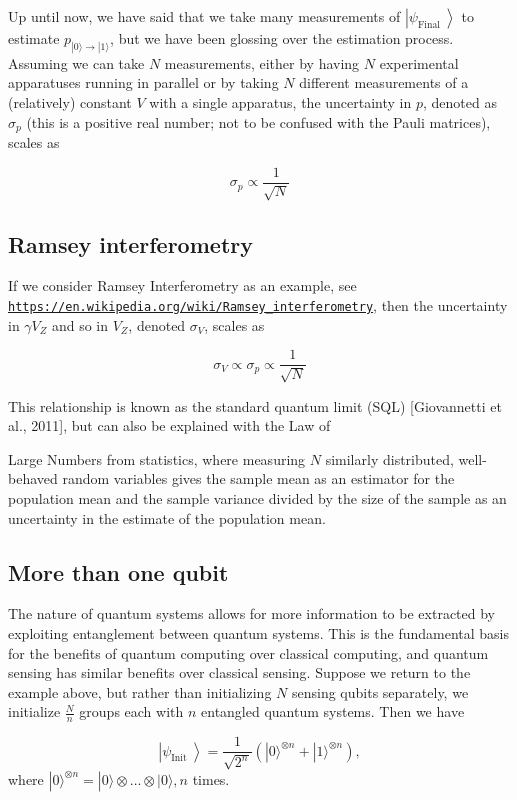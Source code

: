 \documentclass[%
oneside,                 %
final,                   %
10pt]{article}
\begin{document}
Up until now, we have said that we take many measurements of
$\left|\psi_{\text {Final }}\right\rangle$ to estimate $p_{|0\rangle
\rightarrow|1\rangle}$, but we have been glossing over the estimation
process. Assuming we can take $N$ measurements, either by having $N$
experimental apparatuses running in parallel or by taking $N$
different measurements of a (relatively) constant $V$ with a single
apparatus, the uncertainty in $p$, denoted as $\sigma_{p}$ (this is a
positive real number; not to be confused with the Pauli matrices),
scales as

\[
\sigma_{p} \propto \frac{1}{\sqrt{N}}
\]

\subsection{Ramsey interferometry}

If we consider Ramsey Interferometry as an example, see \href{{https://en.wikipedia.org/wiki/Ramsey_interferometry}}{\nolinkurl{https://en.wikipedia.org/wiki/Ramsey_interferometry}}, then the
uncertainty in $\gamma V_Z$ and so in $V_Z$, denoted $\sigma_{V}$,
scales as

\[
\sigma_{V} \propto \sigma_{p} \propto \frac{1}{\sqrt{N}}
\]

This relationship is known as the standard quantum limit (SQL)
[Giovannetti et al., 2011], but can also be explained with the Law of

Large Numbers from statistics, where measuring $N$ similarly
distributed, well-behaved random variables gives the sample mean as an
estimator for the population mean and the sample variance divided by
the size of the sample as an uncertainty in the estimate of the
population mean.

\subsection{More than one qubit}

The nature of quantum systems allows for more information to be
extracted by exploiting entanglement between quantum systems. This is
the fundamental basis for the benefits of quantum computing over
classical computing, and quantum sensing has similar benefits over
classical sensing. Suppose we return to the example above, but rather
than initializing $N$ sensing qubits separately, we initialize
$\frac{N}{n}$ groups each with $n$ entangled quantum systems. Then we
have

\[
\left|\psi_{\text {Init }}\right\rangle=\frac{1}{\sqrt{2^{n}}}\left(|0\rangle^{\otimes n}+|1\rangle^{\otimes n}\right),
\]
where $|0\rangle^{\otimes n}=|0\rangle \otimes \ldots \otimes|0\rangle, n$ times.
\end{document}
